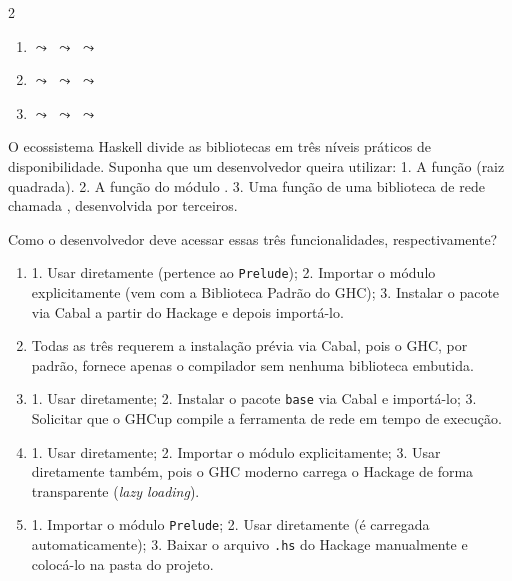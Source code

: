 \documentclass[a4paper,10pt,brazil]{article}
\begin{document}
\begin{multicols}{2}
\begin{enumerate}
  \item {} $\leadsto$  $\leadsto$  $\leadsto$ 

  \item {} $\leadsto$  $\leadsto$  $\leadsto$ 

  \item {} $\leadsto$  $\leadsto$  $\leadsto$ 


\end{enumerate}

O ecossistema Haskell divide as bibliotecas em três níveis práticos de disponibilidade. Suponha que um desenvolvedor queira utilizar:
1. A função  (raiz quadrada).
2. A função  do módulo .
3. Uma função de uma biblioteca de rede chamada , desenvolvida por terceiros.

Como o desenvolvedor deve acessar essas três funcionalidades, respectivamente?

\begin{enumerate}
  \item 1. Usar diretamente (pertence ao \texttt{Prelude}); 2. Importar o módulo explicitamente (vem com a Biblioteca Padrão do GHC); 3. Instalar o pacote via Cabal a partir do Hackage e depois importá-lo.

  \item Todas as três requerem a instalação prévia via Cabal, pois o GHC, por padrão, fornece apenas o compilador sem nenhuma biblioteca embutida.

  \item 1. Usar diretamente; 2. Instalar o pacote \texttt{base} via Cabal e importá-lo; 3. Solicitar que o GHCup compile a ferramenta de rede em tempo de execução.

  \item 1. Usar diretamente; 2. Importar o módulo explicitamente; 3. Usar diretamente também, pois o GHC moderno carrega o Hackage de forma transparente (\emph{lazy loading}).

  \item 1. Importar o módulo \texttt{Prelude}; 2. Usar diretamente (é carregada automaticamente); 3. Baixar o arquivo \texttt{.hs} do Hackage manualmente e colocá-lo na pasta do projeto.



\end{enumerate}
\end{multicols}
\end{document}
